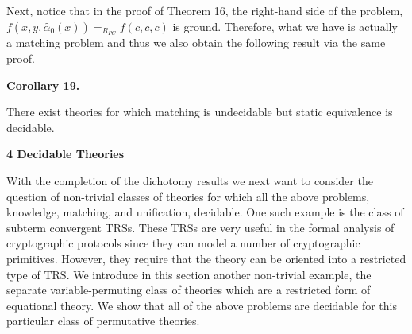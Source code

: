  
 
 
Next, notice that in the proof of Theorem 16, the right-hand side of the problem, $f(x,y,\widetilde{\alpha_{0}}(x))=_{R_{PC}}f(c,c,c)$ is ground. Therefore, what we have is actually a matching problem and thus we also obtain the following result via the same proof.\par
 
 
 
\par\medskip\noindent\textbf{Corollary 19.}\par
 
 
There exist theories for which matching is undecidable but static equivalence is decidable.\par
 
 
 
 
 


 
\par\medskip\noindent\textbf{4 Decidable Theories}\par
 
 
With the completion of the dichotomy results we next want to consider the question of non-trivial classes of theories for which all the above problems, knowledge, matching, and unification, decidable. One such example is the class of subterm convergent TRSs. These TRSs are very useful in the formal analysis of cryptographic protocols since they can model a number of cryptographic primitives. However, they require that the theory can be oriented into a restricted type of TRS. We introduce in this section another non-trivial example, the separate variable-permuting class of theories which are a restricted form of equational theory. We show that all of the above problems are decidable for this particular class of permutative theories.\par
 
 
 
